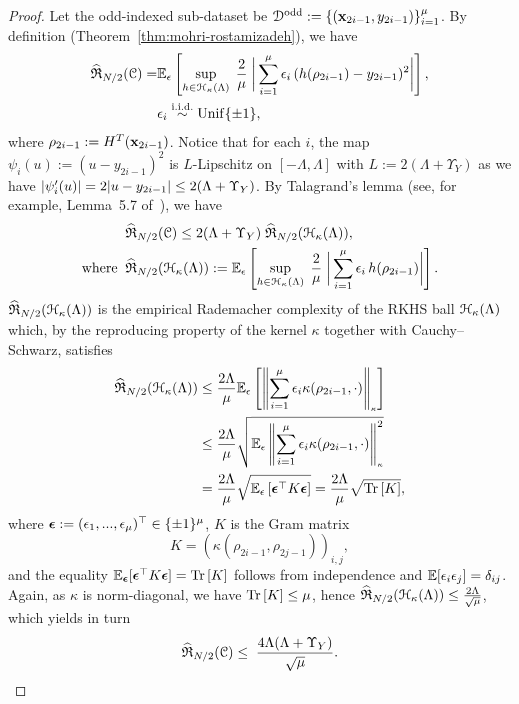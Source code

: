 \begin{proof}
Let the odd-indexed sub-dataset be
${\mathcal{D}}^{\rm odd}:=\{({\mathbf{x}}_{2i-1},y_{2i-1})\}_{i=1}^{\mu}$. By definition (Theorem~\ref{thm:mohri-rostamizadeh}), we have
\begin{equation*}
\begin{aligned}
    \widehat{\mathfrak{R}}_{N/2}({\mathcal{C}}) = &\mathbb{E}_{\epsilon}\left[\sup_{h \in {\mathcal{H}}_{\kappa}(\Lambda)} \; \frac{2}{\mu} \; \bigg| \sum_{i=1}^\mu \epsilon_i \, (h(\rho_{2i-1}) - y_{2i-1})^2 \bigg|\right], \\
    &\epsilon_i \stackrel{\text{i.i.d.}}{\sim}\mathrm{Unif}\{\pm 1\},
\end{aligned}
\end{equation*}
where $\rho_{2i-1} := H^T({\mathbf{x}}_{2i-1})$. Notice that for each $i$, the map $\psi_i(u) := (u - y_{2i-1})^2$ is $L$-Lipschitz on $[-\Lambda, \Lambda]$ with $L := 2 (\Lambda + \Upsilon_Y)$ as we have $\left| \psi_i'(u) \right| = 2|u - y_{2i-1}| \leq 2 (\Lambda + \Upsilon_Y)$. By Talagrand's lemma (see, for example, Lemma~5.7 of~\cite{mohri2018foundations}), we have
\begin{equation*}
\begin{aligned}
    &\widehat{\mathfrak{R}}_{N/2}({\mathcal{C}}) \leq 2 (\Lambda + \Upsilon_Y)\; \widehat{\mathfrak{R}}_{N/2}({\mathcal{H}}_{\kappa}(\Lambda)),\\
    \text{where} \;\; &\widehat{\mathfrak{R}}_{N/2}({\mathcal{H}}_{\kappa}(\Lambda)) :=\mathbb{E}_{\epsilon}\left[\sup_{h \in {\mathcal{H}}_{\kappa}(\Lambda)} \; \frac{2}{\mu} \; \bigg| \sum_{i=1}^\mu \epsilon_i \, h(\rho_{2i-1}) \bigg|\right].
\end{aligned}
\end{equation*}
$\widehat{\mathfrak{R}}_{N/2}({\mathcal{H}}_{\kappa}(\Lambda))$ is the empirical Rademacher complexity of the RKHS ball ${\mathcal{H}}_{\kappa}(\Lambda)$ which, by the reproducing property of the kernel $\kappa$ together with Cauchy--Schwarz, satisfies
\begin{equation*}
\begin{aligned}
    \widehat{\mathfrak{R}}_{N/2}({\mathcal{H}}_{\kappa}(\Lambda)) &\leq \frac{2 \Lambda}{\mu} \mathbb{E}_{\epsilon}\left[\left\lVert\sum_{i=1}^\mu \epsilon_i \kappa(\rho_{2i-1}, \cdot)\right\rVert_{\scriptscriptstyle \kappa}\right]\\
    & \leq \frac{2 \Lambda}{\mu} \sqrt{\mathbb{E}_\epsilon \left\lVert\sum_{i=1}^\mu \epsilon_i \kappa(\rho_{2i-1}, \cdot)\right\rVert_{\scriptscriptstyle \kappa}^2}\\ 
    &= \frac{2 \Lambda}{\mu} \sqrt{\mathbb{E}_{\epsilon} \left[\boldsymbol{\epsilon}^\top K \boldsymbol{\epsilon}\right]} = \frac{2 \Lambda}{\mu}\sqrt{\operatorname{Tr}\left[K\right]},
\end{aligned}
\end{equation*}
where $\boldsymbol{\epsilon} := (\epsilon_1, ..., \epsilon_\mu)^\top \in \{\pm 1\}^\mu$, $K$ is the Gram matrix $$K =(\kappa(\rho_{2i-1}, \rho_{2j-1}))_{i,j},$$ and the equality $\mathbb{E}_{\boldsymbol{\epsilon}}[\boldsymbol{\epsilon}^\top K \boldsymbol{\epsilon}] = \operatorname{Tr}\left[K\right]$ follows from independence and $\mathbb{E}[\epsilon_i\epsilon_j] = \delta_{ij}$. Again, as $\kappa$ is norm-diagonal, we have $\operatorname{Tr}\left[K\right] \leq \mu$, hence $\widehat{\mathfrak{R}}_{N/2}({\mathcal{H}}_{\kappa}(\Lambda)) \leq \tfrac{2\Lambda}{\sqrt{\mu}}$, which yields in turn
\begin{equation*}
    \widehat{\mathfrak{R}}_{N/2}({\mathcal{C}}) \leq  \; \frac{4 \Lambda (\Lambda + \Upsilon_Y)}{\sqrt{\mu}}.
\end{equation*}

\end{proof}



